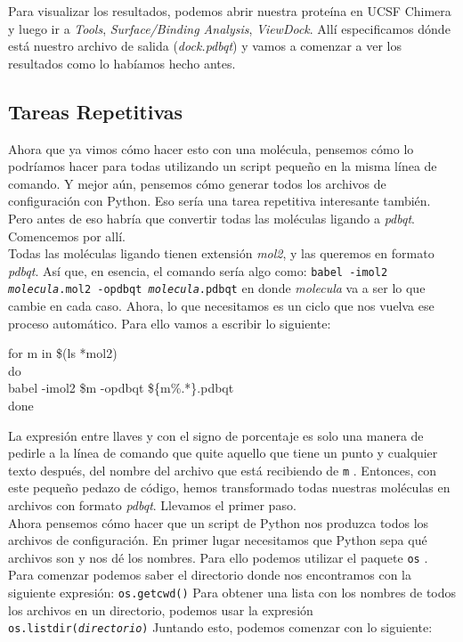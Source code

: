 \documentclass[10pt,letterpaper]{article}
\newcommand{\inlinecode}[1]{
\colorbox{light-gray}{\texttt{#1}}
}
\newenvironment{Code}
{
\begin{lrbox}{\selvestebox}%
\begin{minipage}{\dimexpr\columnwidth-2\fboxsep\relax}
\fontfamily{\ttdefault}\selectfont
}
{\end{minipage}\end{lrbox}%
\begin{center}
\colorbox{light-gray}{\usebox{\selvestebox}}
\end{center}
}
\begin{document}
Para visualizar los resultados, podemos abrir nuestra prote\'ina en UCSF Chimera y luego ir a \emph{Tools}, \emph{Surface/Binding Analysis}, \emph{ViewDock}. All\'i especificamos d\'onde est\'a nuestro archivo de salida (\emph{dock.pdbqt}) y vamos a comenzar a ver los resultados como lo hab\'iamos hecho antes.\\

\subsection{Tareas Repetitivas}

Ahora que ya vimos c\'omo hacer esto con una mol\'ecula, pensemos c\'omo lo podr\'iamos hacer para todas utilizando un script peque\~no en la misma l\'inea de comando. Y mejor a\'un, pensemos c\'omo generar todos los archivos de configuraci\'on con Python. Eso ser\'ia una tarea repetitiva interesante tambi\'en. Pero antes de eso habr\'ia que convertir todas las mol\'eculas ligando a \emph{pdbqt}. Comencemos por all\'i.\\

Todas las mol\'eculas ligando tienen extensi\'on \emph{mol2}, y las queremos en formato \emph{pdbqt}. As\'i que, en esencia, el comando ser\'ia algo como: \inlinecode{babel -imol2 \emph{molecula}.mol2 -opdbqt \emph{molecula}.pdbqt} en donde \emph{molecula} va a ser lo que cambie en cada caso. Ahora, lo que necesitamos es un ciclo que nos vuelva ese proceso autom\'atico. Para ello vamos a escribir lo siguiente:

\begin{Code}
for m in \$(ls *mol2)\\
do\\
babel -imol2 \$m -opdbqt \$\{m\%.*\}.pdbqt\\
done
\end{Code}

La expresi\'on entre llaves y con el signo de porcentaje es solo una manera de pedirle a la l\'inea de comando que quite aquello que tiene un punto y cualquier texto despu\'es, del nombre del archivo que est\'a recibiendo de \inlinecode{m}. Entonces, con este peque\~no pedazo de c\'odigo, hemos transformado todas nuestras mol\'eculas en archivos con formato \emph{pdbqt}. Llevamos el primer paso.\\

Ahora pensemos c\'omo hacer que un script de Python nos produzca todos los archivos de configuraci\'on. En primer lugar necesitamos que Python sepa qu\'e archivos son y nos d\'e los nombres. Para ello podemos utilizar el paquete \inlinecode{os}. Para comenzar podemos saber el directorio donde nos encontramos con la siguiente expresi\'on: \inlinecode{os.getcwd()} Para obtener una lista con los nombres de todos los archivos en un directorio, podemos usar la expresi\'on \inlinecode{os.listdir(\emph{directorio})} Juntando esto, podemos comenzar con lo siguiente:
\end{document}
